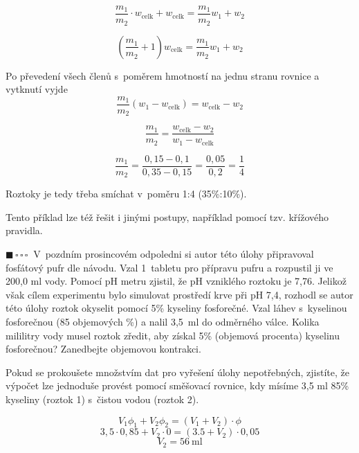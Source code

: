 \documentclass{book}
\newcommand{\jeden}{$\blacksquare \, \square \, \square \, \square \; \; $}
\renewenvironment{quotation}{\par}{\par} %
\begin{document}
\[
\frac{m_{1}}{m_{2}}\cdot w_{\mathrm{celk}} + w_{\mathrm{celk}}=\frac{m_{1}}{m_{2}}w_{1}+w_{2}
\]

\[
\left(\frac{m_{1}}{m_{2}}+1\right)w_{\mathrm{celk}}=\frac{m_{1}}{m_{2}}w_{1}+w_{2}
\]

Po převedení všech členů s~poměrem hmotností na jednu stranu rovnice a vytknutí vyjde
\[
\frac{m_{1}}{m_{2}}\left(w_{1}-w_{\mathrm{celk}}\right)=w_{\mathrm{celk}}-w_{2}
\]

\[
\frac{m_{1}}{m_{2}}=\frac{w_{\mathrm{celk}}-w_{2}}{w_{1}-w_{\mathrm{celk}}}
\]

\[
\frac{m_{1}}{m_{2}}=\frac{0,15-0,1}{0,35-0,15}=\frac{0,05}{0,2} =\frac{1}{4}
\]

Roztoky je tedy třeba smíchat v~poměru 1:4 (35\%:10\%).

Tento příklad lze též řešit i jinými postupy, například pomocí tzv. křížového pravidla.

\hrulefill %
\begin{quotation}
\jeden V~pozdním prosincovém odpoledni si autor této úlohy připravoval fosfátový
pufr dle návodu. Vzal 1~tabletu pro přípravu pufru a rozpustil ji
ve 200,0 ml vody. Pomocí pH metru zjistil, že pH vzniklého roztoku
je 7,76. Jelikož však cílem experimentu bylo simulovat prostředí krve
při pH 7,4, rozhodl se autor této úlohy roztok okyselit pomocí 5\%
kyseliny fosforečné. Vzal láhev s~kyselinou fosforečnou (85 objemových \%)
a nalil 3,5~ml do odměrného válce. Kolika mililitry vody musel roztok zředit,
aby získal 5\% (objemová procenta) kyselinu fosforečnou? Zanedbejte objemovou kontrakci.
\end{quotation} \dotfill \par 

Pokud se prokoušete množstvím dat pro vyřešení úlohy nepotřebných, zjistíte, že výpočet lze jednoduše provést pomocí směšovací rovnice, kdy mísíme 3,5 ml 85\% kyseliny
(roztok 1) s~čistou vodou (roztok 2).

\[
V_{1}\phi_{1}+V_{2}\phi_{2}=(V_{1}+V_{2})\cdot\phi
\]
\[
3,5\cdot0,85+V_{2}\cdot0=(3.5+V_{2})\cdot0,05
\]
\[
V_{2}=56\ \mathrm{ml}
\]
\end{document}
